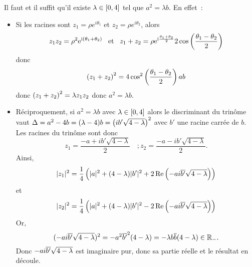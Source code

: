 \documentclass{magnolia}
\begin{document}
\begin{sol}
Il faut et il suffit qu'il existe $\lambda\in\left[0,4\right]$ tel que
$a^2=\lambda b$. En effet~:
\begin{itemize}
\item Si les racines sont $z_1=\rho e^{i\theta_1}$ et $z_2=\rho e^{i\theta_2}$,
	alors
	\[z_1z_2=\rho^2 {\rm e}^{{\rm i}\left(\theta_1+\theta_2\right)} \quad\!\text{et}\quad\!
		z_1+z_2=\rho {\rm e}^{{\rm i}\frac{\theta_1+\theta_2}{2}}
		2\cos\left(\frac{\theta_1-\theta_2}{2}\right)\]
	donc \[\left(z_1+z_2\right)^2=4\cos^2\left(\frac{\theta_1-\theta_2}{2}\right) ab\]
	donc $\left(z_1+z_2\right)^2=\lambda z_1z_2$ donc $a^2=\lambda b$.
\item Réciproquement, si $a^2=\lambda b$ avec $\lambda\in\left[0,4\right]$ alors le discriminant du trinôme vaut $\Delta=a^2-4b=(\lambda-4)b=\left(ib'\sqrt{4-\lambda}\right)^2$ avec $b'$ une racine carrée de $b$. Les racines du trinôme sont donc $$z_1=\frac{-a+ib'\sqrt{4-\lambda}}{2} \quad ; z_2=\frac{-a-ib'\sqrt{4-\lambda}}{2}.$$
Ainsi, $$|z_1|^2=\frac{1}{4}\left(|a|^2+(4-\lambda)|b'|^2+2\mathop{\rm Re}\left(-ai\overline{b'}\sqrt{4-\lambda}\right)\right)$$ et $$|z_2|^2=\frac{1}{4}\left(|a|^2+(4-\lambda)|b'|^2-2\mathop{\rm Re}\left(-ai\overline{b'}\sqrt{4-\lambda}\right)\right)$$
Or, $$(-ai\overline{b'}\sqrt{4-\lambda})^2=-a^2\overline{b'}^2(4-\lambda)=-\lambda b\overline{b}(4-\lambda)\in\mathbb{R}_-.$$
Donc $-ai\overline{b'}\sqrt{4-\lambda}$ est imaginaire pur, donc sa partie réelle et le résultat en découle.
\end{itemize}
\end{sol}

\end{document}
